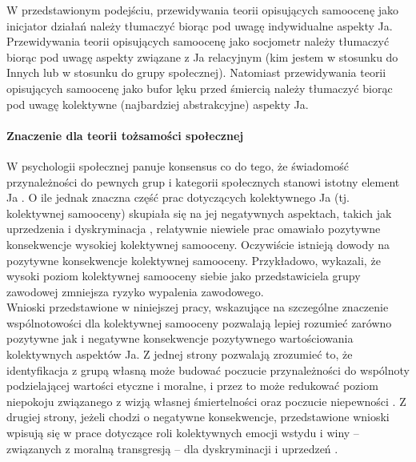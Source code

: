 \documentclass[man]{apa6}
\begin{document}
W przedstawionym podejściu, przewidywania teorii opisujących samoocenę jako inicjator działań należy tłumaczyć biorąc pod uwagę indywidualne aspekty Ja. Przewidywania teorii opisujących samoocenę jako socjometr należy tłumaczyć biorąc pod uwagę aspekty związane z Ja relacyjnym (kim jestem w stosunku do Innych lub w stosunku do grupy społecznej). Natomiast przewidywania teorii opisujących samoocenę jako bufor lęku przed śmiercią należy tłumaczyć biorąc pod uwagę kolektywne (najbardziej abstrakcyjne) aspekty Ja.\\

\paragraph{Znaczenie dla teorii tożsamości społecznej} W psychologii społecznej panuje konsensus co do tego, że świadomość przynależności do pewnych grup i kategorii społecznych stanowi istotny element Ja \parencite{ellemers2012group}. O ile jednak znaczna część prac dotyczących kolektywnego Ja (tj. kolektywnej samooceny) skupiała się na jej negatywnych aspektach, takich jak uprzedzenia i dyskryminacja \parencite[np.,][]{branscombe1994collective, crocker1990collective, jetten1997distinctiveness}, relatywnie niewiele prac omawiało pozytywne konsekwencje wysokiej kolektywnej samooceny. Oczywiście istnieją dowody na pozytywne konsekwencje kolektywnej samooceny. Przykładowo, \textcite{butler2005collective} wykazali, że wysoki poziom kolektywnej samooceny siebie jako przedstawiciela grupy zawodowej zmniejsza ryzyko wypalenia zawodowego.\\

Wnioski przedstawione w niniejszej pracy, wskazujące na szczególne znaczenie wspólnotowości dla kolektywnej samooceny pozwalają lepiej rozumieć zarówno pozytywne jak i negatywne konsekwencje pozytywnego wartościowania kolektywnych aspektów Ja. Z jednej strony pozwalają zrozumieć to, że identyfikacja z grupą własną może budować poczucie przynależności do wspólnoty podzielającej wartości etyczne i moralne, i przez to może redukować poziom niepokoju związanego z wizją własnej śmiertelności \parencite{castano2004case} oraz poczucie niepewności \parencite{hogg2000subjective}. Z drugiej strony, jeżeli chodzi o negatywne konsekwencje, przedstawione wnioski wpisują się w prace dotyczące roli kolektywnych emocji wstydu i winy -- związanych z moralną transgresją -- dla dyskryminacji i uprzedzeń \parencite[np.,][]{gausel2011concern}.\\
\end{document}
